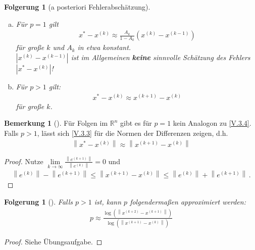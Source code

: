 \documentclass[ngerman,fontsize=11pt, paper=a4, parskip=half, titlepage=true, toc=bib]{scrbook}
\theoremstyle{definition}
\newtheorem{Bem}[Def]{Bemerkung}	%
\theoremstyle{plain}
\newtheorem{Fol}[Def]{Folgerung}
\newcommand{\R}{\mathds{R}}
\newcommand{\nn}[1]{\left\| #1 \right\|}
\newcommand{\subsectione}[1]{\addtocounter{Def}{1}\subsection{#1}}
\newenvironment{Fole}[1][]{ %
	\begin{Fol}[#1]
		}
		{
			\end{Fol}
			\addtocounter{subsection}{1}
			}
\newenvironment{Beme}[1][]{ %
	\begin{Bem}[#1]
	}
	{
	\end{Bem}
	\addtocounter{subsection}{1}
}
\begin{document}
\begin{Fole}[a posteriori Fehlerabschätzung]~
	\begin{enumerate}[a)]
		\item Für $p=1$ gilt
		\begin{gather}
		x^{*}-x^{(k)} \approx \frac{A_k}{1-A_k}(x^{(k)}-x^{(k-1)})
		\label{V.3.4}
		\end{gather}
		für große $k$ und $A_k$ in etwa konstant. \\
		$|x^{(k)}-x^{(k-1)}|$ ist im Allgemeinen \textbf{keine} sinnvolle Schätzung
		des Fehlers $|x^{*}-x^{(k)}|$!
		\item Für $p>1$ gilt:
		\begin{gather}
		x^{*}-x^{(k)} \approx x^{(k+1)}-x^{(k)}
		\label{V.3.5}
		\end{gather}
		für große $k$.
	\end{enumerate}
\end{Fole}
  
  
  \begin{Beme}
  	Für Folgen im $\R^n$ gibt es für $p=1$ kein Analogon zu \eqref{V.3.4}.
  	Falls $p>1$, lässt sich \eqref{V.3.3} für die Normen der Differenzen zeigen,
  	d.h.
  	\begin{gather}
  	\nn{x^{*}-x^{(k)}} \approx \nn{x^{(k+1)}-x^{(k)}}
  	\label{V.3.6}
  	\end{gather}
  	
  	\begin{proof}
  		Nutze $\lim\limits_{k\rightarrow\infty} \frac{\nn{e^{(k+1)}}}{\nn{e^{(k)}}} =0$
  		und 
  		\begin{gather*}
  		\nn{e^{(k)}}-\nn{e^{(k+1)}}\leq \nn{x^{(k+1)}-x^{(k)}} \leq \nn{e^{(k)}}+\nn{e^{(k+1)}} \, .
  		\end{gather*}
  	\end{proof}
  \end{Beme}
  
  
\begin{Fole}
	Falls $p>1$ ist, kann $p$ folgendermaßen approximiert werden:
	\begin{gather*}
	p \approx \frac{\log(\nn{x^{(k+2)}-x^{(k+1)}})}{\log(\nn{x^{(k+1)}-x^{(k)}})}
	\end{gather*}
\end{Fole}
  
  \begin{proof}
    Siehe Übungsaufgabe.
  \end{proof}
  
\end{document}
